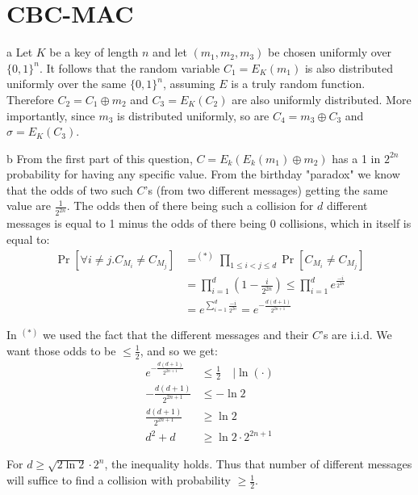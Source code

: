 \documentclass{article}
\begin{document}
\section{CBC-MAC}
\begin{paragraph}
	a Let $K$ be a key of length $n$ and let $(m_1, m_2, m_3)$ be chosen uniformly over $\{0, 1\}^n$. It follows that the random variable $C_1 = E_K(m_1)$ is also distributed uniformly over the same $\{0, 1\}^n$, assuming $E$ is a truly random function. Therefore $C_2 = C_1 \oplus m_2$ and $C_3 = E_K(C_2)$ are also uniformly distributed. More importantly, since $m_3$ is distributed uniformly, so are $C_4 = m_3 \oplus C_3$ and $\sigma = E_K(C_3)$.
\end{paragraph}

\begin{paragraph}
    b From the first part of this question, $C = E_k(E_k(m_1) \oplus m_2)$ has a 1 in $2^{2n}$ probability for having any specific value. From the birthday "paradox" we know that the odds of two such $C$'s (from two different messages) getting the same value are $\frac{1}{2^{2n}}$. The odds then of there being such a collision for $d$ different messages is equal to 1 minus the odds of there being 0 collisions, which in itself is equal to:
    \begin{align*}
        \Pr[\forall i \neq j. C_{M_i} \neq C_{M_j}] &=^{(*)} \prod\limits_{1 \leq i < j \leq d}\Pr[C_{M_i} \neq C_{M_j}]\\
        &= \prod\limits_{i = 1}^d \left(1 - \frac{i}{2^{2n}}\right) \leq \prod\limits_{i = 1}^d e^{\frac{-i}{2^{2n}}}\\
        &= e^{\sum\limits_{i = 1}^d \frac{-i}{2^{2n}}} = e^{-\frac{d(d + 1)}{2^{2n+1}}}
    \end{align*}
    
    In $^{(*)}$ we used the fact that the different messages and their $C$'s are i.i.d. We want those odds to be $\leq \frac{1}{2}$, and so we get:
    \begin{align*}
        e^{-\frac{d(d + 1)}{2^{2n+1}}} &\leq \frac{1}{2} \quad |\ln(\cdot)\\
        -\frac{d(d + 1)}{2^{2n+1}} &\leq -\ln2\\
        \frac{d(d + 1)}{2^{2n+1}} &\geq \ln2\\
        d^2 + d &\geq \ln2 \cdot 2^{2n+1}
    \end{align*}
    
    For $d \geq \sqrt{2\ln2} \cdot 2^n$, the inequality holds. Thus that number of different messages will suffice to find a collision with probability $\geq \frac{1}{2}$.
\end{paragraph}
\end{document}
